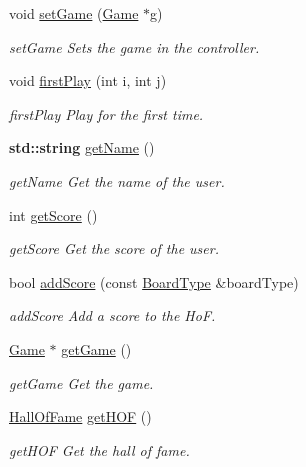 \begin{DoxyCompactItemize}
void \hyperlink{class_controller_a7c1d65311fed834ed285040cd24cb320}{set\+Game} (\hyperlink{class_game}{Game} $\ast$g)
\begin{DoxyCompactList}\small\item\em set\+Game Sets the game in the controller. \end{DoxyCompactList}\item 
void \hyperlink{class_controller_ae83a66c83bfa72f2995aaa8ae1f23cfa}{first\+Play} (int i, int j)
\begin{DoxyCompactList}\small\item\em first\+Play Play for the first time. \end{DoxyCompactList}\item 
\textbf{ std\+::string} \hyperlink{class_controller_ac60aa220e5bf8cd0329b585c817bb5c4}{get\+Name} ()
\begin{DoxyCompactList}\small\item\em get\+Name Get the name of the user. \end{DoxyCompactList}\item 
int \hyperlink{class_controller_a108724342a6e4b06b0574c3a7d615bb2}{get\+Score} ()
\begin{DoxyCompactList}\small\item\em get\+Score Get the score of the user. \end{DoxyCompactList}\item 
bool \hyperlink{class_controller_a913c8ab636b486a26a4dd533d84e15b6}{add\+Score} (const \hyperlink{struct_board_type}{Board\+Type} \&board\+Type)
\begin{DoxyCompactList}\small\item\em add\+Score Add a score to the HoF. \end{DoxyCompactList}\item 
\hyperlink{class_game}{Game} $\ast$ \hyperlink{class_controller_aa6f9cab2dd64ec7f93e4834bf44ca4a7}{get\+Game} ()
\begin{DoxyCompactList}\small\item\em get\+Game Get the game. \end{DoxyCompactList}\item 
\hyperlink{class_hall_of_fame}{Hall\+Of\+Fame} \hyperlink{class_controller_abdad52832c8cd32d0f1e0c51442bda4c}{get\+H\+OF} ()
\begin{DoxyCompactList}\small\item\em get\+H\+OF Get the hall of fame. \end{DoxyCompactList}\item 

\end{DoxyCompactItemize}
